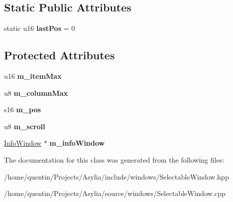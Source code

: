 \subsection*{Static Public Attributes}
\begin{DoxyCompactItemize}
\item 
\hypertarget{classSelectableWindow_a148a4bf43c59ad0af9e7d95a9ec6e2ae}{static u16 {\bfseries last\-Pos} = 0}\label{classSelectableWindow_a148a4bf43c59ad0af9e7d95a9ec6e2ae}

\end{DoxyCompactItemize}
\subsection*{Protected Attributes}
\begin{DoxyCompactItemize}
\item 
\hypertarget{classSelectableWindow_a47b0055334e7ca5c11e8f9945dccdd2d}{u16 {\bfseries m\-\_\-item\-Max}}\label{classSelectableWindow_a47b0055334e7ca5c11e8f9945dccdd2d}

\item 
\hypertarget{classSelectableWindow_adc7dd0ae783888cef0b79cb213e330d4}{u8 {\bfseries m\-\_\-column\-Max}}\label{classSelectableWindow_adc7dd0ae783888cef0b79cb213e330d4}

\item 
\hypertarget{classSelectableWindow_a4cede24d2226f928b29dcb0c32b3aa30}{s16 {\bfseries m\-\_\-pos}}\label{classSelectableWindow_a4cede24d2226f928b29dcb0c32b3aa30}

\item 
\hypertarget{classSelectableWindow_a949a88001a4c8d48306a59728966411e}{u8 {\bfseries m\-\_\-scroll}}\label{classSelectableWindow_a949a88001a4c8d48306a59728966411e}

\item 
\hypertarget{classSelectableWindow_af50ebd7a84ac520fa2b9909c94ac2397}{\hyperlink{classInfoWindow}{Info\-Window} $\ast$ {\bfseries m\-\_\-info\-Window}}\label{classSelectableWindow_af50ebd7a84ac520fa2b9909c94ac2397}

\end{DoxyCompactItemize}


The documentation for this class was generated from the following files\-:\begin{DoxyCompactItemize}
\item 
/home/quentin/\-Projects/\-Asylia/include/windows/Selectable\-Window.\-hpp\item 
/home/quentin/\-Projects/\-Asylia/source/windows/Selectable\-Window.\-cpp\end{DoxyCompactItemize}
